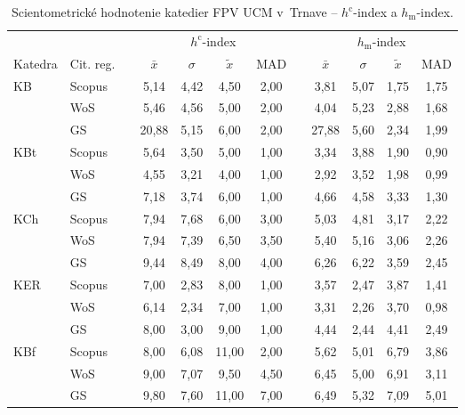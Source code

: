 \begin{table}
  \centering\small
  \caption[Hodnotenie FPV -- $h^{\mathrm{c}}$-index a $h_{\mathrm{m}}$-index]%
  {Scientometrické hodnotenie katedier FPV UCM v~Trnave -- $h^{\mathrm{c}}$-index a $h_{\mathrm{m}}$-index.}
  \label{tab:6-staff.results}
  \begin{tabularx}{\textwidth}{XXp{1ex}ccccp{1ex}cccc}
    \toprule
    & & & \multicolumn{4}{c}{$h^{\mathrm{c}}$-index} & & \multicolumn{4}{c}{$h_{\mathrm{m}}$-index} \\
    \cmidrule{4-7}\cmidrule{9-12}
    Katedra & Cit. reg. & & $\bar{x}$ & $\sigma$ & $\tilde{x}$ & MAD & & $\bar{x}$ & $\sigma$ & $\tilde{x}$ & MAD \\
    \midrule
    KB   & Scopus & & 5,14  & 4,42 & 4,50  & 2,00 & & 3,81  & 5,07 & 1,75 & 1,75 \\
         & WoS    & & 5,46  & 4,56 & 5,00  & 2,00 & & 4,04  & 5,23 & 2,88 & 1,68 \\
         & GS     & & 20,88 & 5,15 & 6,00  & 2,00 & & 27,88 & 5,60 & 2,34 & 1,99 \\[1ex]
    KBt  & Scopus & & 5,64  & 3,50 & 5,00  & 1,00 & & 3,34  & 3,88 & 1,90 & 0,90 \\
         & WoS    & & 4,55  & 3,21 & 4,00  & 1,00 & & 2,92  & 3,52 & 1,98 & 0,99 \\
         & GS     & & 7,18  & 3,74 & 6,00  & 1,00 & & 4,66  & 4,58 & 3,33 & 1,30 \\[1ex]
    KCh  & Scopus & & 7,94  & 7,68 & 6,00  & 3,00 & & 5,03  & 4,81 & 3,17 & 2,22 \\
         & WoS    & & 7,94  & 7,39 & 6,50  & 3,50 & & 5,40  & 5,16 & 3,06 & 2,26 \\
         & GS     & & 9,44  & 8,49 & 8,00  & 4,00 & & 6,26  & 6,22 & 3,59 & 2,45 \\[1ex]
    KER  & Scopus & & 7,00  & 2,83 & 8,00  & 1,00 & & 3,57  & 2,47 & 3,87 & 1,41 \\
         & WoS    & & 6,14  & 2,34 & 7,00  & 1,00 & & 3,31  & 2,26 & 3,70 & 0,98 \\
         & GS     & & 8,00  & 3,00 & 9,00  & 1,00 & & 4,44  & 2,44 & 4,41 & 2,49 \\[1ex]
    KBf  & Scopus & & 8,00  & 6,08 & 11,00 & 2,00 & & 5,62  & 5,01 & 6,79 & 3,86 \\
         & WoS    & & 9,00  & 7,07 & 9,50  & 4,50 & & 6,45  & 5,00 & 6,91 & 3,11 \\
         & GS     & & 9,80  & 7,60 & 11,00 & 7,00 & & 6,49  & 5,32 & 7,09 & 5,01 \\[1ex]

\end{tabularx}
\end{table}
